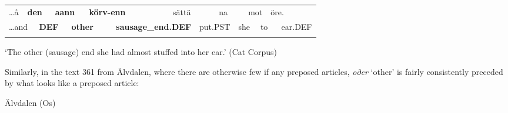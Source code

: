 \begin{tabular}{llllllllllllllll}
\lsptoprule
…å & \multicolumn{2}{l}{{\bfseries den}

} & \multicolumn{2}{l}{{\bfseries aann}

} & \multicolumn{2}{l}{{\bfseries körv-enn}

} & \multicolumn{2}{l}{sättä

} & \multicolumn{2}{l}{na

} & \multicolumn{2}{l}{mot

} & \multicolumn{2}{l}{öre.

} & \\
\multicolumn{2}{l}{…and

} & \multicolumn{2}{l}{{\bfseries DEF}

} & \multicolumn{2}{l}{{\bfseries other}

} & \multicolumn{2}{l}{{\bfseries sausage\_end.DEF}

} & \multicolumn{2}{l}{put.PST

} & \multicolumn{2}{l}{she

} & \multicolumn{2}{l}{to

} & \multicolumn{2}{l}{ear.DEF

}\\
\lspbottomrule
\end{tabular}

\begin{styleTranslation}
‘The other (sausage) end she had almost stuffed into her ear.’ (Cat Corpus)

\end{styleTranslation}

\begin{styleBodyTextFirst}
Similarly, in the text 361 from Älvdalen, where there are otherwise few if any preposed articles, \textit{oðer} ‘other’ is fairly consistently preceded by what looks like a preposed article:

\end{styleBodyTextFirst}


\begin{listWWNumileveli}
\item 

\begin{styleExample}
Älvdalen (Os)

\end{styleExample}

\end{listWWNumileveli}

